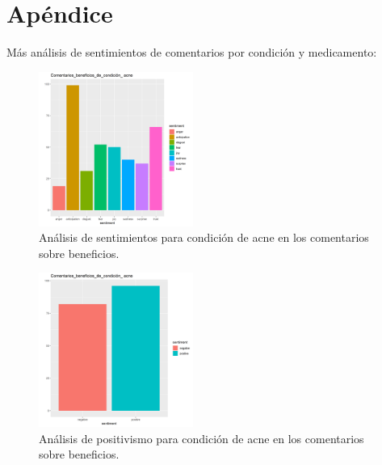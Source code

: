 \documentclass[spanish,]{article}
\begin{document}
\newpage 

\section{Apéndice}\label{apendice}

Más análisis de sentimientos de comentarios por condición y medicamento:

\begin{figure}[h]
    \centering
    \includegraphics[width=0.45\textwidth]{figuras/sentimientos/Aacne1.png}
    \caption{Análisis de sentimientos para condición de acne en los comentarios sobre beneficios.}
    \label{fig:sentimientos:1}
\end{figure}

\begin{figure}[h]
    \centering
    \includegraphics[width=0.45\textwidth]{figuras/sentimientos/Aacne2.png}
    \caption{Análisis de positivismo para condición de acne en los comentarios sobre beneficios.}
    \label{fig:sentimientos:2}
\end{figure}
\end{document}
